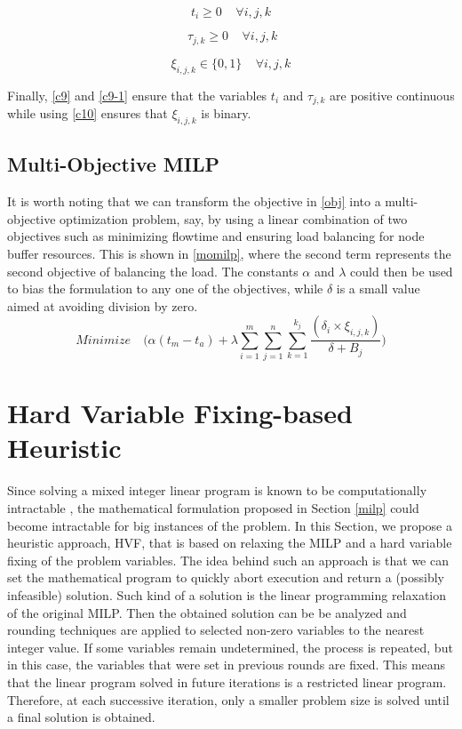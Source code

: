 \documentclass[conference]{IEEEtran}
\begin{document}
\begin{equation}
t_{i} \geq 0 \ \ \ \ \   \forall i, j, k
\label{c9}
\end{equation}

\begin{equation}
\ \tau_{j,k} \geq 0 \ \ \ \ \   \forall i, j, k
\label{c9-1}
\end{equation}

\begin{equation}
\xi_{i,j,k} \in \{0,1\} \ \ \ \ \   \forall i, j, k
\label{c10}
\end{equation}

Finally, \eqref{c9} and \eqref{c9-1} ensure that the variables $t_{i}$ and $\tau_{j,k}$ are positive continuous while using \eqref{c10} ensures that $\xi_{i,j,k}$ is binary.

\subsection{Multi-Objective MILP}
It is worth noting that we can transform the objective in \eqref{obj} into a multi-objective optimization problem, say, by using a linear combination of two objectives such as minimizing flowtime and ensuring load balancing for node buffer resources. This is shown in \eqref{momilp}, where the second term represents the second objective of balancing the load. The constants $\alpha$ and 
$\lambda$ could then be used to bias the formulation to any one of the objectives, while $\delta$ is a small value aimed at avoiding division by zero.
\begin{equation}
Minimize \quad \Bigg(\alpha (t_m - t_a) + \lambda \sum\limits_{i=1}^{m}\sum\limits_{j=1}^{n}\sum\limits_{k=1}^{k_j} \frac{(\delta_i \times \xi_{i,j,k})}{\delta + B_j} \Bigg)
\label{momilp}
\end{equation}

\section{Hard Variable Fixing-based Heuristic}\label{hardvariable}

Since solving a mixed integer linear program is known to be computationally intractable \cite{Schrijver86}, the mathematical formulation proposed in Section \ref{milp} could become intractable for big instances of the problem. In this Section, we propose a heuristic approach, HVF, that is based on relaxing the MILP and a hard variable fixing \cite{FischettiLodi2003} of the problem variables. The idea behind such an approach is that we can set the mathematical program to quickly abort execution and return a (possibly infeasible) solution. Such kind of a solution is the linear programming relaxation of the original MILP. Then the obtained solution can be be analyzed and rounding techniques are applied to selected non-zero variables to the nearest integer value. If some variables remain undetermined, the process is repeated, but in this case, the variables that were set in previous rounds are fixed. This means that the linear program solved in future iterations is a restricted linear program. Therefore, at each successive iteration, only a smaller problem size is solved until a final solution is obtained.
\end{document}
